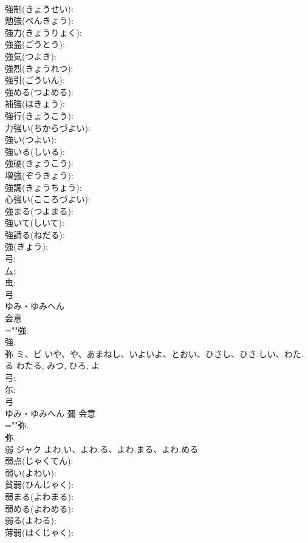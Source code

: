 \documentclass[8pt]{extreport}
\begin{document}
\begin{CJK}{UTF8}{min}
\\	強制(きょうせい): 
\\	勉強(べんきょう): 
\\	強力(きょうりょく): 
\\	強盗(ごうとう): 
\\	強気(つよき): 
\\	強烈(きょうれつ): 
\\	強引(ごういん): 
\\	強める(つよめる): 
\\	補強(ほきょう): 
\\	強行(きょうこう): 
\\	力強い(ちからづよい): 
\\	強い(つよい): 
\\	強いる(しいる): 
\\	強硬(きょうこう): 
\\	増強(ぞうきょう): 
\\	強調(きょうちょう): 
\\	心強い(こころづよい): 
\\	強まる(つよまる): 
\\	強いて(しいて): 
\\	強請る(ねだる): 
\\	強(きょう): 
\\	弓: 
\\	厶: 
\\	虫: 
\\	弓	
\\	ゆみ・ゆみへん	
\\	会意 
\\	=""強.
\\	強.
\\	弥	ミ、ビ	いや、や、あまねし、いよいよ、とおい、ひさし、ひさ.しい、わた.る	わたる, みつ, ひろ, よ	
\\	弓: 
\\	尓: 
\\	弓	
\\	ゆみ・ゆみへん	彌	会意 
\\	=""弥.
\\	弥.
\\	弱	ジャク	よわ.い、よわ.る、よわ.まる、よわ.める		
\\	弱点(じゃくてん): 
\\	弱い(よわい): 
\\	貧弱(ひんじゃく): 
\\	弱まる(よわまる): 
\\	弱める(よわめる): 
\\	弱る(よわる): 
\\	薄弱(はくじゃく): 

\end{CJK}
\end{document}
